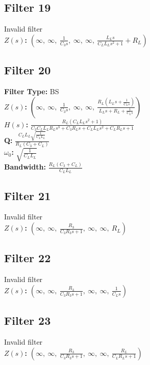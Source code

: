 \documentclass{article}
\begin{document}
\subsection*{Filter 19}
Invalid filter \\ 
\textbf{$Z(s)$:} $\left( \infty, \  \infty, \  \frac{1}{C_{3} s}, \  \infty, \  \infty, \  \frac{L_{L} s}{C_{L} L_{L} s^{2} + 1} + R_{L}\right)$ \\ 
\subsection*{Filter 20}
\textbf{Filter Type:} BS \\ 
\textbf{$Z(s)$:} $\left( \infty, \  \infty, \  \frac{1}{C_{3} s}, \  \infty, \  \infty, \  \frac{R_{L} \left(L_{L} s + \frac{1}{C_{L} s}\right)}{L_{L} s + R_{L} + \frac{1}{C_{L} s}}\right)$ \\ 
\textbf{$H(s)$:} $\frac{R_{L} \left(C_{L} L_{L} s^{2} + 1\right)}{C_{3} C_{L} L_{L} R_{L} s^{3} + C_{3} R_{L} s + C_{L} L_{L} s^{2} + C_{L} R_{L} s + 1}$ \\ 
\textbf{Q:} $\frac{C_{L} L_{L} \sqrt{\frac{1}{C_{L} L_{L}}}}{R_{L} \left(C_{3} + C_{L}\right)}$ \\ 
\textbf{$\omega_0$:} $\sqrt{\frac{1}{C_{L} L_{L}}}$ \\ 
\textbf{Bandwidth:} $\frac{R_{L} \left(C_{3} + C_{L}\right)}{C_{L} L_{L}}$ \\ 
\subsection*{Filter 21}
Invalid filter \\ 
\textbf{$Z(s)$:} $\left( \infty, \  \infty, \  \frac{R_{3}}{C_{3} R_{3} s + 1}, \  \infty, \  \infty, \  R_{L}\right)$ \\ 
\subsection*{Filter 22}
Invalid filter \\ 
\textbf{$Z(s)$:} $\left( \infty, \  \infty, \  \frac{R_{3}}{C_{3} R_{3} s + 1}, \  \infty, \  \infty, \  \frac{1}{C_{L} s}\right)$ \\ 
\subsection*{Filter 23}
Invalid filter \\ 
\textbf{$Z(s)$:} $\left( \infty, \  \infty, \  \frac{R_{3}}{C_{3} R_{3} s + 1}, \  \infty, \  \infty, \  \frac{R_{L}}{C_{L} R_{L} s + 1}\right)$ \\ 
\end{document}
